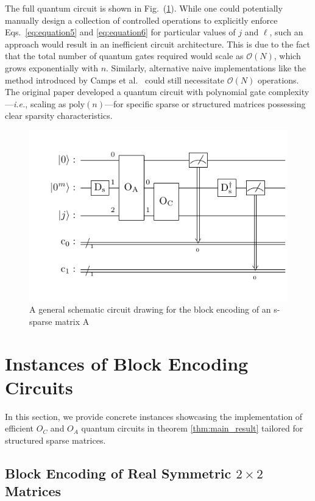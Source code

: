 \documentclass{article}
\begin{document}
    The full quantum circuit is shown in Fig.~(\ref{fig:circuit2}).
    While one could potentially manually design a collection of controlled operations to explicitly enforce Eqs.~\eqref{eq:equation5} and \eqref{eq:equation6} for particular values of $j$ and $\ell$, such an approach would result in an inefficient circuit architecture.
    This is due to the fact that the total number of quantum gates required would scale as $\mathcal{O}(N)$, which grows exponentially with $n$.
    Similarly, alternative naive implementations like the method introduced by Camps et al.~\cite{camps2022fable} could still necessitate $\mathcal{O}(N)$ operations.
    The original paper developed a quantum circuit with polynomial gate complexity---\emph{i.e.}, scaling as $\text{poly}(n)$---for specific sparse or structured matrices possessing clear sparsity characteristics.
    \begin{figure}[htbp]
        \centering
        \includegraphics{pdf/main_circuit}
        \caption{
            A general schematic circuit drawing for the block encoding of an s-sparse matrix A
        }
        \label{fig:circuit2}
    \end{figure}


    \section{Instances of Block Encoding Circuits}\label{sec:instances}

    In this section, we provide concrete instances showcasing the implementation of efficient $O_C$ and $O_A$ quantum circuits in theorem \ref{thm:main_result} tailored for structured sparse matrices.

    \subsection{Block Encoding of Real Symmetric $2 \times 2$ Matrices}
\end{document}
